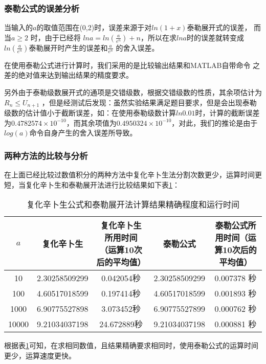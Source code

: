 \documentclass[UTF8]{ctexart}
\begin{document}
	\subsubsection{泰勒公式的误差分析} %
	\par{当输入的$a$的取值范围在(0,2)时，误差来源于对$ln(1+x)$泰勒展开式的误差，
	而当$a\geq2$ 时，由于已经将 $lna=ln(\frac{a}{e^n})+n $，所以在求$lna$时的误差就转变成 $ln(\frac{a}{e^n})$泰勒展开时产生的误差和$\frac{a}{e^n}$ 的舍入误差。}
	\par{在使用泰勒公式进行计算时，我们采用的是比较输出结果和MATLAB自带命令 之差的绝对值来达到输出结果的精度要求。}
	\par{另外由于泰勒级数展开式的通项是交错级数，根据交错级数的性质，其余项估计为$R_n\leq U_{n+1}$ ，但是经测试后发现：虽然实验结果满足题目要求，但是会出现泰勒级数的估计值小于截断误差，如：在使用泰勒级数计算$ln0.01$时，计算的截断误差为$0.4782574\times10^{-10}$，而其余项值为$0.4950324\times10^{-10}$，对此，我们的推论是由于$log(a)$命令自身产生的舍入误差所导致。}
	
	\subsubsection{两种方法的比较与分析} %
	\par{在上面已经比较过数值积分的两种方法中复化辛卜生法分割次数更少，运算时间更短，当复化辛卜生和泰勒展开法进行比较结果如下表\ref{tab:BiJiaoShiJian}：}
		\begin{table}[!htbp]
		\centering
		\caption{复化辛卜生公式和泰勒展开法计算结果精确程度和运行时间}%
		\label{tab:BiJiaoShiJian} %
		\begin{tabular}{ccccc}
			\hline 
			$a$ & 复化辛卜生 & 复化辛卜生所用时间（运算10次后的平均值） & 泰勒公式 & 泰勒公式所用时间（运算10次后的平均值） \\ 
			\hline 
			10 & 2.30258509299 & 0.042054秒 & 2.30258509299 & 0.007378 秒 \\ 
			100 & 4.60517018599 & 0.197414秒 & 4.60517018599 & 0.001893 秒 \\ 
			1000 & 6.90775527898 & 3.073452秒 & 6.90775527899 & 0.000762 秒 \\ 
			10000 & 9.21034037198 & 24.672889秒 & 9.21034037198 & 0.000881 秒 \\ 
			\hline 
		\end{tabular} 
	\end{table}	
	\par{根据表\ref{tab:BiJiaoShiJian}可知，在求相同数值，且结果精确要求相同时，使用泰勒公式的运算时间更少，运算速度更快。	}
\end{document}
